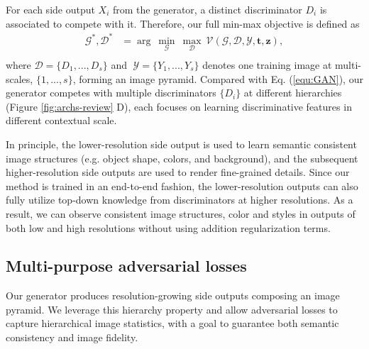 \documentclass[10pt,twocolumn,letterpaper]{article}
\begin{document}
For each side output $X_i$ from the generator, a distinct discriminator $D_i$ is associated to compete with it. Therefore, our full min-max objective is defined as 
\begin{equation}
\label{equ:optim}
\begin{split}
  \mathcal{G}^*, \mathcal{D}^*&  =  \arg~\underset{\mathcal{G}}{\min}\ \underset{\mathcal{D}}{\max}~ \mathcal{V}(\mathcal{G},\mathcal{D}, \mathcal{Y}, \bm t, \bm z), \\
\end{split}
\end{equation}
where $\mathcal{D}  =  \{D_1, ..., D_s\} $ and $\; \mathcal{Y} = \{Y_1, ..., Y_s\}$ denotes one training image at multi-scales, $\{1,...,s\}$, forming an image pyramid.
Compared with Eq. (\ref{equ:GAN}), our generator competes with multiple discriminators  $\{D_i\}$ at different hierarchies (Figure \ref{fig:archs-review} D), each focuses on learning discriminative features in different contextual scale.

In principle, the lower-resolution side output is used to learn semantic consistent image structures (e.g. object shape, colors, and background), and the subsequent higher-resolution side outputs are used to render fine-grained details. Since our method is trained in an end-to-end fashion, the lower-resolution outputs can also fully utilize top-down knowledge from discriminators at higher resolutions. As a result, we can observe consistent image structures, color and styles in outputs of both low and high resolutions without using addition regularization terms.


\subsection{Multi-purpose adversarial losses}
Our generator produces resolution-growing side outputs composing an image pyramid. 
We leverage this hierarchy property and allow adversarial losses to capture hierarchical image statistics, with a goal to guarantee both semantic consistency and image fidelity. 
\end{document}
